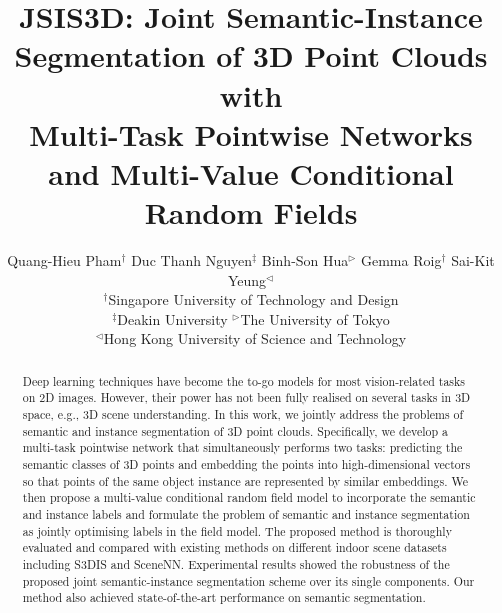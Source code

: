 \documentclass[10pt,twocolumn,letterpaper]{article}
\begin{document}
\title{JSIS3D: Joint Semantic-Instance Segmentation of 3D Point Clouds with \\
  Multi-Task Pointwise Networks and Multi-Value Conditional Random Fields}

\author{
  Quang-Hieu Pham$^{\dagger}$ \hspace{0.2in}
  Duc Thanh Nguyen$^{\ddagger}$ \hspace{0.2in}
  Binh-Son Hua$^{\rhd}$ \hspace{0.2in}
  Gemma Roig$^{\dagger}$ \hspace{0.2in}
  Sai-Kit Yeung$^{\lhd}$
  \\
  $^{\dagger}$Singapore University of Technology and Design
  \\
  $^{\ddagger}$Deakin University \hspace{0.5in}
  $^{\rhd}$The University of Tokyo
  \\
  $^{\lhd}$Hong Kong University of Science and Technology
}

\maketitle
\thispagestyle{empty}

\begin{abstract}
  Deep learning techniques have become the to-go models for most vision-related
  tasks on 2D images. However, their power has not been fully realised on
  several tasks in 3D space, e.g., 3D scene understanding. In this work, we
  jointly address the problems of semantic and instance segmentation of 3D point
  clouds. Specifically, we develop a multi-task pointwise network that
  simultaneously performs two tasks: predicting the semantic classes of 3D
  points and embedding the points into high-dimensional vectors so that points
  of the same object instance are represented by similar embeddings. We then
  propose a multi-value conditional random field model to incorporate the
  semantic and instance labels and formulate the problem of semantic and
  instance segmentation as jointly optimising labels in the field model. The
  proposed method is thoroughly evaluated and compared with existing methods on
  different indoor scene datasets including S3DIS and SceneNN. Experimental
  results showed the robustness of the proposed joint semantic-instance
  segmentation scheme over its single components. Our method also achieved
  state-of-the-art performance on semantic segmentation.
\end{abstract}
\end{document}
